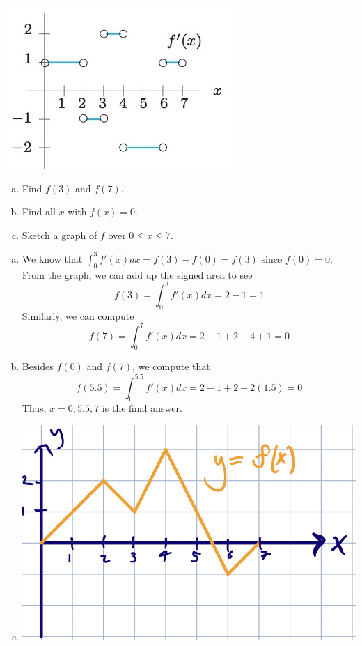 \documentclass[11pt]{exam}
\begin{document}
\begin{questions}
  \begin{minipage}{0.5\linewidth}
    \includegraphics[scale=0.4]{Figures/no33}
  \end{minipage}
  \begin{minipage}{0.5\linewidth}
    \begin{enumerate}[(a)]
    \item Find \(f(3)\) and \(f(7)\).
    \item Find all \(x\) with \(f(x) = 0\).
    \item Sketch a graph of \(f\) over \(0 \leq x \leq 7\).
    \end{enumerate}
  \end{minipage}
  \begin{solution}
    \begin{enumerate}[(a)]
    \item We know that \(\int_0^3 f'(x) dx = f(3)-f(0) = f(3)\) since
      \(f(0) = 0\). From the graph, we can add up the signed area to
      see \[
        f(3) = \int_0^3 f'(x) dx = 2-1 = 1
      \]
      Similarly, we can compute \[
        f(7) = \int_0^7 f'(x) dx = 2-1+2-4+1 = 0
      \]
    \item Besides \(f(0)\) and \(f(7)\), we compute that \[
        f(5.5) = \int_0^{5.5} f'(x) dx = 2-1+2-2(1.5) = 0
      \]
      Thus, \(x=0,5.5,7\) is the final answer.
    \item \includegraphics[scale=0.5]{Figures/3c}
    \end{enumerate}
  \end{solution}
\question \,


\end{questions}
\end{document}
